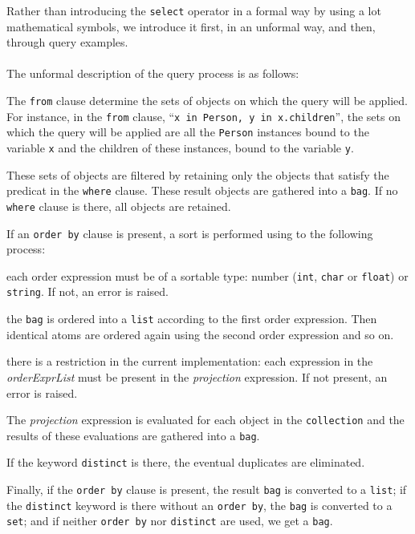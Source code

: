 Rather than introducing the \texttt{select} operator in a formal way by
using a lot mathematical symbols, we introduce it first, in an unformal way,
and then, through query examples.\\
\\
The unformal description of the query process is as follows:
\be
\item The \texttt{from} clause
determine the sets of objects on which the query will be applied.
For instance, in the \texttt{from} clause,
``\texttt{x in Person, y in x.children}'', the sets on which
the query will be applied are
all the \texttt{Person} instances bound to the variable \texttt{x}
and the children of these instances, bound to the variable
\texttt{y}.
\item These sets of objects are filtered by retaining only the objects
that satisfy the predicat in the \texttt{where} clause. These result objects
are gathered into a \texttt{bag}. If no \texttt{where} clause is there, all objects are
retained.
\item If an \texttt{order by} clause is present, a sort is performed
using to the following process:
\be
\item each order expression must be of a sortable type: number (\texttt{int},
\texttt{char} or \texttt{float}) or \texttt{string}. If not, an
error is raised.
\item the \texttt{bag} is ordered into a \texttt{list} according to
the first order expression. Then identical atoms are ordered again using
the second order expression and so on.
\item there is a restriction in the current implementation:
each expression in the \emph{orderExprList} must be present
in the \emph{projection} expression. If not present, an
error is raised.
\ee
\item The \emph{projection} expression is evaluated for each
object in the \texttt{collection} and the results of these evaluations are gathered
into a \texttt{bag}.
\item If the keyword \texttt{distinct} is there, the eventual duplicates are
eliminated.
\item Finally, if the \texttt{order by} clause is present, the
result \texttt{bag} is converted to a \texttt{list};
if the \texttt{distinct} keyword is there without an \texttt{order by},
the \texttt{bag} is converted to a \texttt{set}; and if neither
\texttt{order by} nor \texttt{distinct} are used, we get a \texttt{bag}.
